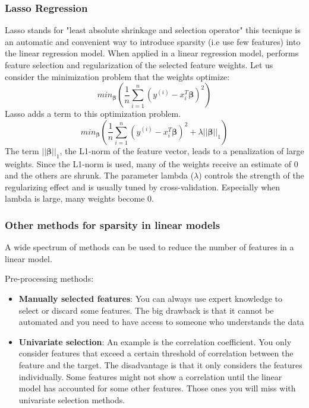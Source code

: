 \subsubsection{Lasso Regression}
Lasso stands for "least absolute shrinkage and selection operator" this tecnique is an automatic and convenient way to introduce sparsity (i.e use few features) into the linear regression model.
When applied in a linear regression model, performs feature selection and regularization of the selected feature weights.
Let us consider the minimization problem that the weights optimize:
\begin{equation*}
    min_{\boldsymbol{\beta}}\left(\frac{1}{n}\sum_{i=1}^n(y^{(i)}-x_i^T\boldsymbol{\beta})^2\right)
\end{equation*}
Lasso adds a term to this optimization problem.
\begin{equation*}
    min_{\boldsymbol{\beta}}\left(\frac{1}{n}\sum_{i=1}^n(y^{(i)}-x_{i}^T\boldsymbol{\beta})^2+\lambda||\boldsymbol{\beta}||_1\right)
\end{equation*}
The term $||\boldsymbol{\beta}||_1$, the L1-norm of the feature vector, leads to a penalization of large weights. 
Since the L1-norm is used, many of the weights receive an estimate of 0 and the others are shrunk.
The parameter lambda ($\lambda$) controls the strength of the regularizing effect and is usually tuned by cross-validation. 
Especially when lambda is large, many weights become 0.

\subsubsection{Other methods for sparsity in linear models}
A wide spectrum of methods can be used to reduce the number of features in a linear model.

Pre-processing methods:
\begin{itemize}
    \item \textbf{Manually selected features}: You can always use expert knowledge to select or discard some features. The big drawback is that it cannot be automated and you need to have access to someone who understands the data
    \item \textbf{Univariate selection}: An example is the correlation coefficient. You only consider features that exceed a certain threshold of correlation between the feature and the target. The disadvantage is that it only considers the features individually. Some features might not show a correlation until the linear model has accounted for some other features. Those ones you will miss with univariate selection methods.
\end{itemize}

